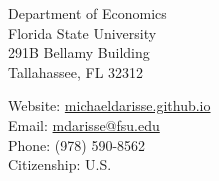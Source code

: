 \documentclass[letterpaper, 11pt]{article}
\begin{document}
\begin{center} \end{center} 

\bigskip
\begin{minipage}[t]{0.495\textwidth}
  Department of Economics \\
  Florida State University \\
  291B Bellamy Building \\
  Tallahassee, FL 32312
\end{minipage}
\begin{minipage}[t]{0.495\textwidth}
  Website: \href{https://michaeldarisse.github.io}{michaeldarisse.github.io} \\
  Email: \href{mailto:mdarisse@fsu.edu}{mdarisse@fsu.edu} \\
  Phone: (978) 590-8562 \\
  Citizenship: U.S.
\end{minipage}

\setlength{\tabcolsep}{8pt}
\end{document}
